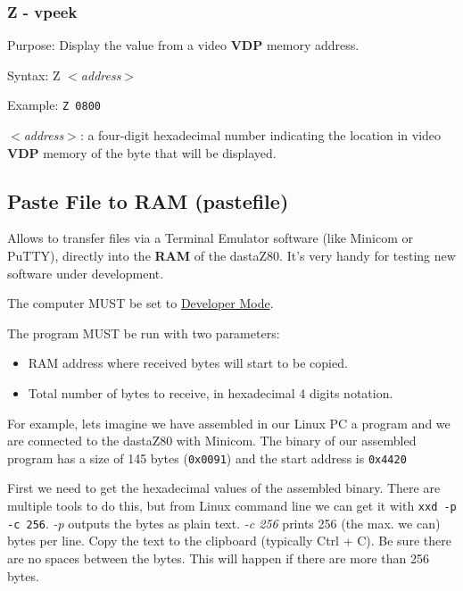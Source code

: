         \subsubsection{Z - vpeek}

        Purpose: Display the value from a video \textbf{VDP} memory address.

        Syntax: Z \textit{$<$address$>$}

        Example: \texttt{Z 0800}

        \hspace{1cm}\textit{$<$address$>$}: a four-digit hexadecimal number
        indicating the location in video \textbf{VDP} memory of the byte that
        will be displayed.

    \subsection{Paste File to RAM (pastefile)}
    \label{software:pastefile}

    Allows to transfer files via a Terminal Emulator software (like Minicom or
    PuTTY), directly into the \textbf{RAM} of the dastaZ80. It's very handy for
    testing new software under
    development.

    The computer MUST be set to \hyperref[subsec:devmode]{Developer Mode}.

    The program MUST be run with two parameters:

    \begin{itemize}
        \item RAM address where received bytes will start to be copied.
        \item Total number of bytes to receive, in hexadecimal 4 digits notation.
    \end{itemize}

    For example, lets imagine we have assembled in our Linux PC a program and
    we are connected to the dastaZ80 with Minicom. The binary of our assembled
    program has a size of 145 bytes (\texttt{0x0091}) and the start address is
    \texttt{0x4420}

    First we need to get the hexadecimal values of the assembled binary. There
    are multiple tools to do this, but from Linux command line we can get it
    with \texttt{xxd -p -c 256}. \textit{-p} outputs the bytes as plain text.
    \textit{-c 256} prints 256 (the max. we can) bytes per line. Copy the text
    to the clipboard (typically Ctrl + C). Be sure there are no spaces between
    the bytes. This will happen if there are more than 256 bytes.

